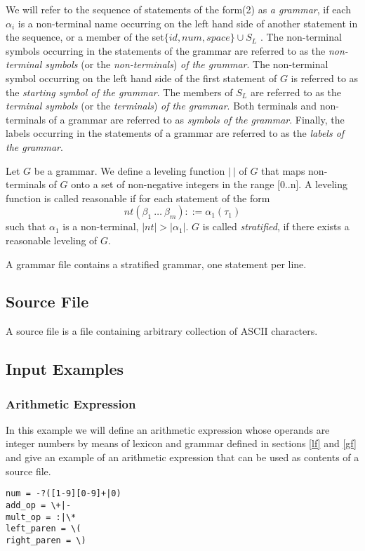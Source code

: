 \documentclass[a4paper,10pt]{article}
\newcounter{subsubsubsection}[subsubsection]
\begin{document}
We will refer to the sequence of statements of the form(2) as \textit{a grammar}, if each $\alpha_i$ is a  non-terminal  name occurring on the left hand side of another statement in the sequence, or a member of the set$\{id, num, space\}\cup S_L$ . The non-terminal symbols occurring in the statements of the grammar are referred to as the \textit{non-terminal symbols} (or the \textit{non-terminals}) \textit{of the grammar}. 
The non-terminal symbol occurring on the left hand side of the first statement of $G$ is referred to as the \textit{starting symbol of the grammar}. The members of $S_L$ are referred to as the \textit{terminal symbols} (or the \textit{terminals}) \textit{of the grammar}.  Both terminals and non-terminals of a grammar are referred to as \textit{symbols of the grammar}. 
Finally, the labels occurring in the statements of a grammar are referred to as the \textit{labels of the grammar}.

Let $G$ be a grammar.
We define a leveling function $|\ |$ of $G$ that maps non-terminals of $G$ onto a set of non-negative integers in the range [0..n].
A leveling function is called reasonable if for each statement of the form 
$$nt(\beta_1~\ldots~\beta_m) ::= \alpha_1(\tau_1)$$
such that  $\alpha_1$ is a non-terminal, $|nt|> |\alpha_1|$.
$G$ is called \textit{stratified}, if there exists a reasonable leveling of $G$.
  
A grammar file contains a stratified grammar, one  statement per line.

\subsection{Source File}\label{sf}
A source file is a file containing arbitrary collection of ASCII characters.

\subsection{Input Examples}\label{ie}
\subsubsection{Arithmetic Expression}
In this example we will define an arithmetic expression whose operands are integer numbers  by means of lexicon and grammar defined in sections \ref{lf} and \ref{gf} and give an example of an arithmetic expression that can be used as contents of a source file.

\label{alex}
\begin{verbatim}
num = -?([1-9][0-9]+|0)
add_op = \+|-
mult_op = :|\*
left_paren = \(
right_paren = \)
\end{verbatim} 
\label{agram}
\end{document}
